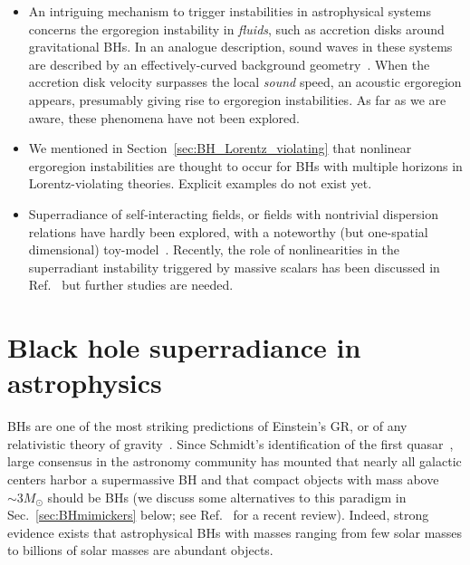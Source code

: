 \documentclass[11pt]{article}
\numberwithin{equation}{section} %
\begin{document}
\begin{itemize}
\item An intriguing mechanism to trigger instabilities in astrophysical systems concerns the ergoregion instability in {\it fluids}, such
as accretion disks around gravitational BHs. In an analogue description, sound waves in these systems are described by an effectively-curved background geometry~\cite{Das:2004wf,Das:2006an,Chaverra:2015aya}. When the accretion disk velocity surpasses the local {\it sound} speed, an acoustic ergoregion appears, presumably giving rise to ergoregion instabilities.
As far as we are aware, these phenomena have not been explored.


\item We mentioned in Section~\ref{sec:BH_Lorentz_violating} that nonlinear ergoregion instabilities are thought to occur for BHs with multiple horizons in Lorentz-violating theories. Explicit examples do not exist yet.

\item Superradiance of self-interacting fields, or fields with nontrivial dispersion relations have hardly been 
explored, with a noteworthy (but one-spatial dimensional) toy-model~\cite{Richartz:2012bd}. Recently, the role of 
nonlinearities in the superradiant instability triggered by massive scalars has been discussed in 
Ref.~\cite{Fukuda:2019ewf} but further studies are needed.

\end{itemize}




\clearpage
\newpage
\section{Black hole superradiance in astrophysics}\label{sec:astrophysics}
BHs are one of the most striking predictions of Einstein's GR, or of any relativistic theory of gravity~\cite{Berti:2015itd}. Since Schmidt's identification
of the first quasar~\cite{Schmidt:1963}, large consensus in the astronomy community has mounted that nearly all galactic 
centers harbor a supermassive BH and that compact objects with mass above $\sim 3M_\odot$ should be BHs (we discuss some alternatives to 
this paradigm in Sec.~\ref{sec:BHmimickers} below; see Ref.~\cite{Cardoso:2019rvt} for a recent review). Indeed, strong 
evidence exists that astrophysical BHs with masses ranging from few solar masses to billions of solar masses are 
abundant objects.
\end{document}
